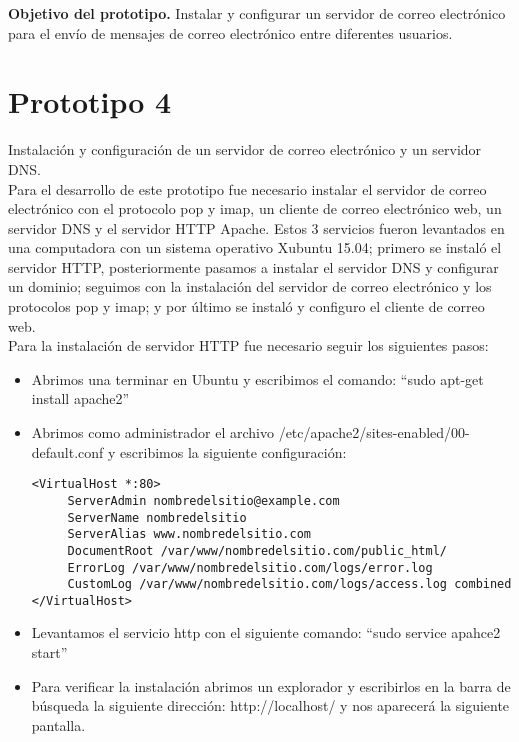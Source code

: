\documentclass[12pt,oneside,onecolumn,openany]{report}
\begin{document}
\textbf{Objetivo del prototipo.}
Instalar y configurar un servidor de correo electrónico para el envío de mensajes de correo electrónico entre diferentes usuarios.\\
\section{Prototipo 4}
Instalación y configuración de un servidor de correo electrónico y un servidor DNS.\\


Para el desarrollo de este prototipo fue necesario instalar el servidor de correo electrónico con el protocolo pop y imap, un cliente de correo electrónico web, un servidor DNS y el servidor HTTP Apache. Estos 3 servicios fueron levantados en una computadora con un sistema operativo Xubuntu 15.04; primero se instaló el servidor HTTP\cite{HTTP}, posteriormente pasamos a instalar el servidor DNS y configurar un dominio\cite{DNS}; seguimos con la instalación del servidor de correo electrónico y los protocolos pop y imap; y por último se instaló y  configuro el cliente de correo web\cite{web}.\\
Para la instalación de servidor HTTP fue necesario seguir los siguientes pasos:\
\begin{itemize}
 \item Abrimos una terminar en Ubuntu y escribimos el comando: “sudo apt-get install apache2”
 \item Abrimos como administrador el archivo /etc/apache2/sites-enabled/00-default.conf y escribimos la siguiente configuración:
 \begin{lstlisting}[frame=single]
  <VirtualHost *:80>
     ServerAdmin nombredelsitio@example.com
     ServerName nombredelsitio
     ServerAlias www.nombredelsitio.com
     DocumentRoot /var/www/nombredelsitio.com/public_html/
     ErrorLog /var/www/nombredelsitio.com/logs/error.log
     CustomLog /var/www/nombredelsitio.com/logs/access.log combined
</VirtualHost>
 \end{lstlisting}
 \item Levantamos el servicio http con el siguiente comando: “sudo service apahce2 start”
 \item Para verificar la instalación abrimos un explorador y escribirlos en la barra de búsqueda la siguiente dirección: http://localhost/ y nos aparecerá la siguiente pantalla.
\end{itemize}
\end{document}
